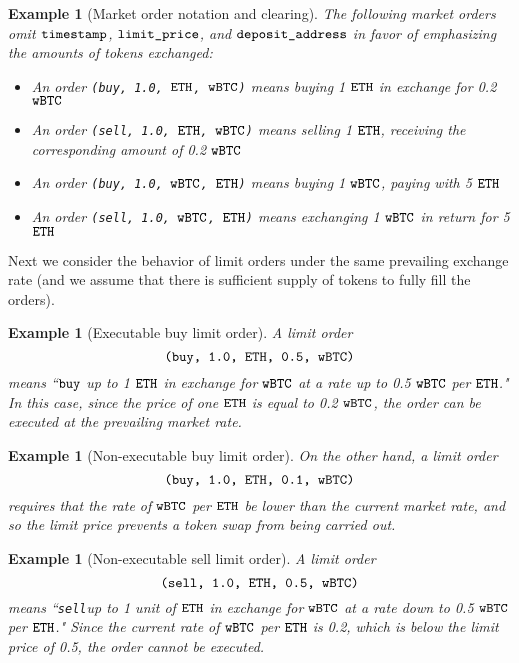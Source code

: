 \documentclass[11pt, reqno]{amsart}
\newtheorem{example}[thm]{Example}
\newcommand{\BTC}{\textnormal{\texttt{wBTC}}}
\newcommand{\ETH}{\textnormal{\texttt{ETH}}}
\newcommand{\timestamp}{\textnormal{\texttt{timestamp}}}
\newcommand{\limitprice}{\textnormal{\texttt{limit\_price}}}
\newcommand{\depositaddress}{\textnormal{\texttt{deposit\_address}}}
\newcommand{\buy}{\textnormal{\texttt{buy}}}
\newcommand{\sell}{\textnormal{\texttt{sell}}}
\begin{document}
\begin{example}[Market order notation and clearing]
The following market orders omit $\timestamp$, $\limitprice$, and
$\depositaddress$ in favor of emphasizing the amounts of tokens exchanged:
\begin{itemize}
    \item An order \texttt{(\buy, 1.0, $\ETH$, $\BTC$)} means buying 1
          $\ETH$ in exchange for 0.2 $\BTC$
    \item An order \texttt{(\sell, 1.0, $\ETH$, $\BTC$)} means selling 1 $\ETH$,
          receiving the corresponding amount of 0.2 $\BTC$
    \item An order \texttt{(\buy, 1.0, $\BTC$, $\ETH$)} means buying 1 $\BTC$,
          paying with 5 $\ETH$
    \item An order \texttt{(\sell, 1.0, $\BTC$, $\ETH$)} means exchanging
          1 $\BTC$ in return for 5 $\ETH$
\end{itemize}
\end{example}

Next we consider the behavior of limit orders under the same prevailing exchange
rate (and we assume that there is sufficient supply of tokens to fully fill the
orders).

\begin{example}[Executable buy limit order]
A limit order
\[
    \texttt{(\buy, 1.0, $\ETH$, 0.5, $\BTC$)}
\]
means
``$\buy$ up to 1 $\ETH$ in exchange for $\BTC$ at a rate up to 0.5 $\BTC$ per $\ETH$."
In this case, since the price of one $\ETH$ is equal to 0.2 $\BTC$, the order
can be executed at the prevailing market rate.
\end{example}

\begin{example}[Non-executable buy limit order]
On the other hand, a limit order
\[
    \texttt{(\buy, 1.0, $\ETH$, 0.1, $\BTC$)}
\]
requires that the rate of $\BTC$ per $\ETH$ be lower than the current market
rate, and so the limit price prevents a token swap from being carried out.
\end{example}

\begin{example}[Non-executable sell limit order]
A limit order
\[
    \texttt{(\sell, 1.0, $\ETH$, 0.5, $\BTC$)}
\]
means
``\sell up to 1 unit of $\ETH$ in exchange for $\BTC$ at a rate down to 0.5 $\BTC$ per $\ETH$."
Since the current rate of $\BTC$ per $\ETH$ is 0.2, which is below the limit
price of 0.5, the order cannot be executed.
\end{example}
\end{document}
